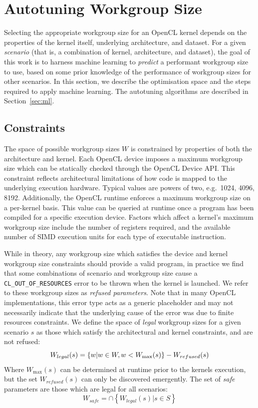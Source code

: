 \documentclass[preprint,nonatbib,10pt]{sigplanconf}
\begin{document}
\section{Autotuning Workgroup Size}

Selecting the appropriate workgroup size for an OpenCL kernel depends
on the properties of the kernel itself, underlying architecture, and
dataset. For a given \emph{scenario} (that is, a combination of
kernel, architecture, and dataset), the goal of this work is to
harness machine learning to \emph{predict} a performant workgroup size
to use, based on some prior knowledge of the performance of workgroup
sizes for other scenarios. In this section, we describe the
optimisation space and the steps required to apply machine
learning. The autotuning algorithms are described in
Section~\ref{sec:ml}.

\subsection{Constraints}

The space of possible workgroup sizes $W$ is constrained by properties
of both the architecture and kernel. Each OpenCL device imposes a
maximum workgroup size which can be statically checked through the
OpenCL Device API. This constraint reflects architectural limitations
of how code is mapped to the underlying execution hardware. Typical
values are powers of two, e.g.\ 1024, 4096, 8192. Additionally, the
OpenCL runtime enforces a maximum workgroup size on a per-kernel
basis. This value can be queried at runtime once a program has been
compiled for a specific execution device. Factors which affect a
kernel's maximum workgroup size include the number of registers
required, and the available number of SIMD execution units for each
type of executable instruction.

While in theory, any workgroup size which satisfies the device and
kernel workgroup size constraints should provide a valid program, in
practice we find that some combinations of scenario and workgroup size
cause a \texttt{CL\_OUT\_OF\_RESOURCES} error to be thrown when the
kernel is launched. We refer to these workgroup sizes as \emph{refused
  parameters}. Note that in many OpenCL implementations, this error
type acts as a generic placeholder and may not necessarily indicate
that the underlying cause of the error was due to finite resources
constraints. We define the space of \emph{legal} workgroup sizes for a
given scenario $s$ as those which satisfy the architectural and kernel
constraints, and are not refused:
%
\begin{equation}
  \footnotesize
  W_{legal}(s) = \left\{w | w \in W, w < W_{\max}(s) \right\} - W_{refused}(s)
\end{equation}
%
Where $W_{\max}(s)$ can be determined at runtime prior to the kernels
execution, but the set $W_{refused}(s)$ can only be discovered
emergently. The set of \emph{safe} parameters are those which are
legal for all scenarios:
%
\begin{equation}
  W_{safe} = \cap \left\{ W_{legal}(s) | s \in S \right\}
\end{equation}
\end{document}
